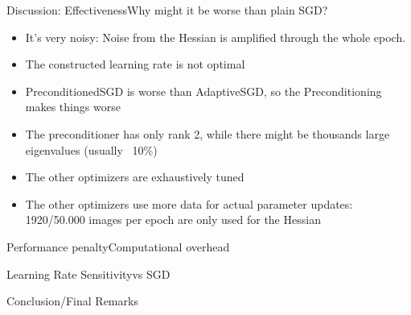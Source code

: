 \documentclass[10pt,usepdftitle=false,aspectratio=169]{beamer}
\begin{document}
\begin{frame}{Discussion: Effectiveness}{Why might it be worse than plain SGD?}
	\begin{itemize}
		\item It's very noisy: Noise from the Hessian is amplified through the whole epoch.
		\item The constructed learning rate is not optimal
		\item PreconditionedSGD is worse than AdaptiveSGD, so the Preconditioning makes things worse
		\item The preconditioner has only rank 2, while there might be thousands large eigenvalues (usually ~10\%)
		\item The other optimizers are exhaustively tuned
		\item The other optimizers use more data for actual parameter updates: 1920/50.000 images per epoch are only used for the Hessian
	\end{itemize}
\end{frame}

\begin{frame}{Performance penalty}{Computational overhead}
\centering

\end{frame}


\begin{frame}{Learning Rate Sensitivity}{vs SGD}
\centering

\end{frame}

\begin{frame}{Conclusion/Final Remarks}{}

\end{frame}


\end{document}
